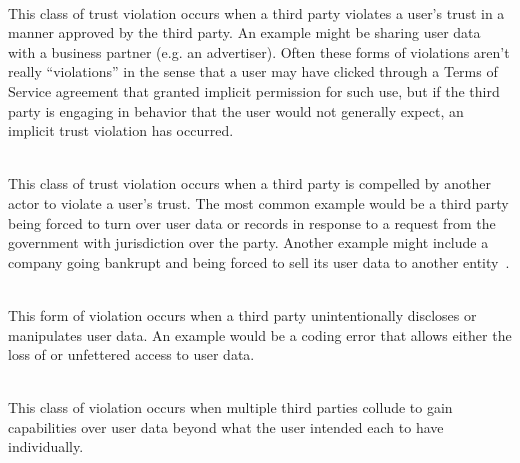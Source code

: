 \begin{packed_desc}
\item[Implicit (P):] \hfill \\ This class of trust violation occurs
  when a third party violates a user's trust in a manner approved by
  the third party. An example might be sharing user data with a
  business partner (e.g. an advertiser). Often these forms of
  violations aren't really ``violations'' in the sense that a user may
  have clicked through a Terms of Service agreement that granted
  implicit permission for such use, but if the third party is engaging
  in behavior that the user would not generally expect, an implicit
  trust violation has occurred.
\item[Compelled (C):] \hfill \\ This class of trust violation occurs
  when a third party is compelled by another actor to violate a user's
  trust. The most common example would be a third party being forced
  to turn over user data or records in response to a request from the
  government with jurisdiction over the party. Another example might
  include a company going bankrupt and being forced to sell its user
  data to another entity~\cite{solove2015}.
\item[Unintentional (U):] \hfill \\ This form of violation occurs when
  a third party unintentionally discloses or manipulates user data. An
  example would be a coding error that allows either the loss of or
  unfettered access to user data.
\item[Colluding (L):] \hfill \\ This class of violation occurs when
  multiple third parties collude to gain capabilities over user data
  beyond what the user intended each to have individually.
\end{packed_desc}
